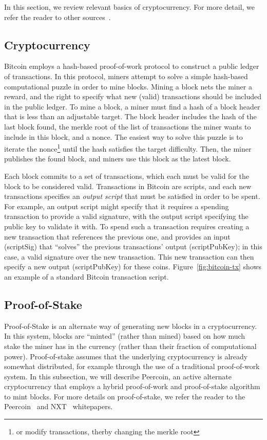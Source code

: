 In this section, we review relevant basics of cryptocurrency. For more
detail, we refer the reader to other
sources~\cite{bitcoin-book,bitcoin-paper,bitcoin-sok}.

\subsection{Cryptocurrency}
\label{sec:scripting}
\FigTx

Bitcoin employs a hash-based proof-of-work protocol to construct a public ledger
of transactions. In this protocol, miners attempt to solve a simple hash-based
computational puzzle in order to mine blocks. Mining a block nets the miner a
reward, and the right to specify what new (valid) transactions should be
included in the public ledger. To mine a block, a miner must find a hash of a
block header that is less than an adjustable target. The block header includes
the hash of the last block found, the merkle root of the list of transactions
the miner wants to include in this block, and a nonce. The easiest way to solve
this puzzle is to iterate the nonce\footnote{or modify transactions, therby
changing the merkle root} until the hash satisfies the target difficulty. Then,
the miner publishes the found block, and miners use this block as the latest
block.

Each block commits to a set of transactions, which each must be valid for the
block to be considered valid. Transactions in Bitcoin are scripts, and each new
transactions specifies an \emph{output script} that must be satisfied in order
to be spent. For example, an output script might specify that it requires a
spending transaction to provide a valid signature, with the output script
specifying the public key to validate it with. To spend such a transaction
requires creating a new transaction that references the previous one, and
provides an input (scriptSig) that ``solves'' the previous transactions' output
(scriptPubKey); in this case, a valid signature over the new transaction. This
new transaction can then specify a new output (scriptPubKey) for these coins.
Figure~\ref{fig:bitcoin-tx} shows an example of a standard Bitcoin transaction
script.


\subsection{Proof-of-Stake}

Proof-of-Stake is an alternate way of generating new blocks in a cryptocurrency.
In this system, blocks are ``minted'' (rather than mined) based on how much
stake the miner has in the currency (rather than their fraction of computational
power). Proof-of-stake assumes that the underlying cryptocurrency is already
somewhat distributed, for example through the use of a traditional proof-of-work
system. In this subsection, we will describe Peercoin, an active
alternate cryptocurrency that employs a hybrid proof-of-work and proof-of-stake
algorithm to mint blocks. For more details on proof-of-stake, we refer the
reader to the Peercoin~\cite{peercoin} and NXT~\cite{nxt} whitepapers.

